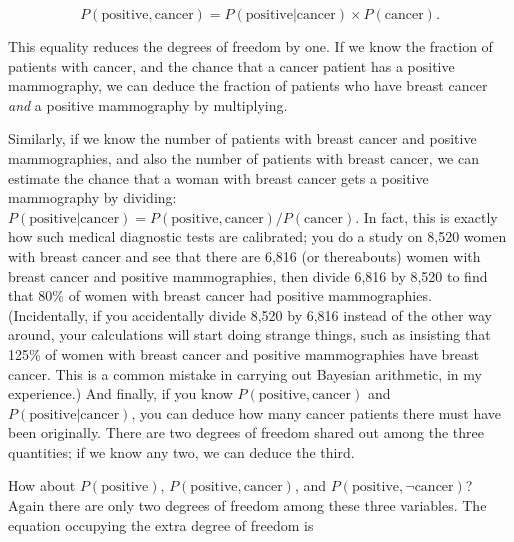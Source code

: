 \begin{equation*}
 P(\text{positive}, \text{cancer}) = P(\text{positive}|\text{cancer}) \times
P(\text{cancer}).
\end{equation*}

{
 This equality reduces the degrees of freedom by one. If we know
the fraction of patients with cancer, and the chance that a cancer
patient has a positive mammography, we can deduce the fraction of
patients who have breast cancer \textit{and} a positive mammography by
multiplying.}

{
 Similarly, if we know the number of patients with breast cancer
and positive mammographies, and also the number of patients with breast
cancer, we can estimate the chance that a woman with breast cancer gets
a positive mammography by dividing: $P(\text{positive}|\text{cancer}) =
P(\text{positive}, \text{cancer})/P(\text{cancer})$. In fact, this is exactly how such
medical diagnostic tests are calibrated; you do a study on 8,520 women
with breast cancer and see that there are 6,816 (or thereabouts) women
with breast cancer and positive mammographies, then divide 6,816 by
8,520 to find that 80\% of women with breast cancer had positive
mammographies. (Incidentally, if you accidentally divide 8,520 by 6,816
instead of the other way around, your calculations will start doing
strange things, such as insisting that 125\% of women with breast
cancer and positive mammographies have breast cancer. This is a common
mistake in carrying out Bayesian arithmetic, in my experience.) And
finally, if you know $P(\text{positive}, \text{cancer})$ and
$P(\text{positive}|\text{cancer})$, you can deduce how many cancer patients
there must have been originally. There are two degrees of freedom
shared out among the three quantities; if we know any two, we can
deduce the third.}

{
 How about $P(\text{positive})$, $P(\text{positive}, \text{cancer})$, and
$P(\text{positive},\lnot\text{cancer})$? Again there are only two degrees of
freedom among these three variables. The equation occupying the extra
degree of freedom is}


